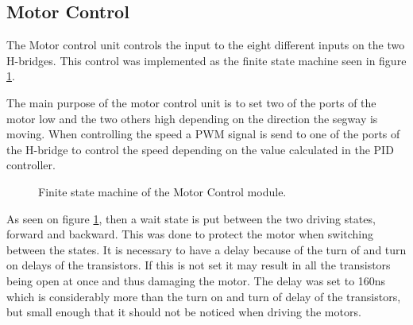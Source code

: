 \subsection{Motor Control}
The Motor control unit controls the input to the eight different inputs on the two H-bridges.
This control was implemented as the finite state machine seen in figure \ref{fig:motorcontrol_fsm}.

The main purpose of the motor control unit is to set two of the ports of the motor low and the two others high depending on the direction the segway is moving.
When controlling the speed a PWM signal is send to one of the ports of the H-bridge to control the speed depending on the value calculated in the PID controller.


\begin{figure}[H]
\centering


\caption{Finite state machine of the Motor Control module.}
\label{fig:motorcontrol_fsm}
\end{figure}


As seen on figure \ref{fig:motorcontrol_fsm}, then a wait state is put between the two driving states, forward and backward.
This was done to protect the motor when switching between the states.
It is necessary to have a delay because of the turn of and turn on delays of the transistors.
If this is not set it may result in all the transistors being open at once and thus damaging the motor.
The delay was set to 160ns which is considerably more than the turn on and turn of delay of the transistors, but small enough that it should not be noticed when driving the motors.
